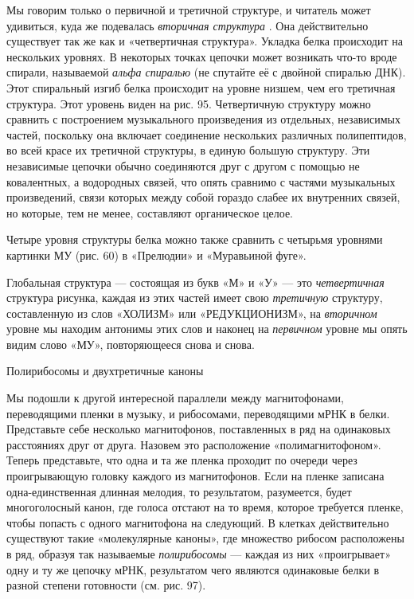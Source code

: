 \documentclass[../main.tex]{subfiles}
\begin{document}
Мы говорим только о первичной и третичной структуре, и читатель может удивиться, куда же подевалась \emph{вторичная структура} . Она действительно существует так же как и «четвертичная структура». Укладка белка происходит на нескольких уровнях. В некоторых точках цепочки может возникать что-то вроде спирали, называемой \emph{альфа спиралью} (не спутайте её с двойной спиралью ДНК). Этот спиральный изгиб белка происходит на уровне низшем, чем его третичная структура. Этот уровень виден на рис. 95. Четвертичную структуру можно сравнить с построением музыкального произведения из отдельных, независимых частей, поскольку она включает соединение нескольких различных полипептидов, во всей красе их третичной структуры, в единую большую структуру. Эти независимые цепочки обычно соединяются друг с другом с помощью не ковалентных, а водородных связей, что опять сравнимо с частями музыкальных произведений, связи которых между собой гораздо слабее их внутренних связей, но которые, тем не менее, составляют органическое целое.

Четыре уровня структуры белка можно также сравнить с четырьмя уровнями картинки МУ (рис. 60) в «Прелюдии» и «Муравьиной фуге».

Глобальная структура --- состоящая из букв «М» и «У» --- это \emph{четвертичная} структура рисунка, каждая из этих частей имеет свою \emph{третичную} структуру, составленную из слов «ХОЛИЗМ» или «РЕДУКЦИОНИЗМ», на \emph{вторичном} уровне мы находим антонимы этих слов и наконец на \emph{первичном} уровне мы опять видим слово «МУ», повторяющееся снова и снова.

Полирибосомы и двухтретичные каноны

Мы подошли к другой интересной параллели между магнитофонами, переводящими пленки в музыку, и рибосомами, переводящими мРНК в белки. Представьте себе несколько магнитофонов, поставленных в ряд на одинаковых расстояниях друг от друга. Назовем это расположение «полимагнитофоном». Теперь представьте, что одна и та же пленка проходит по очереди через проигрывающую головку каждого из магнитофонов. Если на пленке записана одна-единственная длинная мелодия, то результатом, разумеется, будет многоголосный канон, где голоса отстают на то время, которое требуется пленке, чтобы попасть с одного магнитофона на следующий. В клетках действительно существуют такие «молекулярные каноны», где множество рибосом расположены в ряд, образуя так называемые \emph{полирибосомы} --- каждая из них «проигрывает» одну и ту же цепочку мРНК, результатом чего являются одинаковые белки в разной степени готовности (см. рис. 97).
\end{document}
